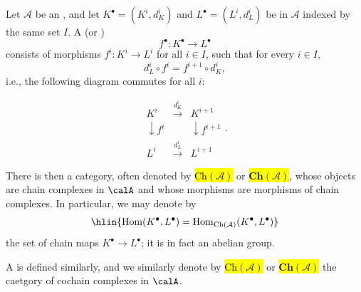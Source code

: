 \begin{definition} \label{definition:chain_complex_of_objects_in_a_preadditive_category}
Let $\mathcal{A}$ be an , and let $K^\bullet = (K^i, d_K^i)$ and $L^\bullet = (L^i, d_L^i)$ be  in $\mathcal{A}$ indexed by the same set $I$. 
A  (or )
$$ f^\bullet: K^\bullet \to L^\bullet $$
consists of morphisms $f^i: K^i \to L^i$ for all $i \in I$, such that for every $i \in I$,
$$ d_L^i \circ f^i = f^{i+1} \circ d_K^i, $$
i.e., the following diagram commutes for all $i$:

$$ \begin{array}{ccc} K^i & \xrightarrow{d_K^i} & K^{i+1} \\ \downarrow{f^i} && \downarrow{f^{i+1}} \\ L^i & \xrightarrow{d_L^i} & L^{i+1} \end{array}.$$

There is then a category, often denoted by \hl{$\mathrm{Ch}(\mathcal{A})$} or \hl{$\mathbf{Ch}(\mathcal{A})$}, whose objects are chain complexes in $\calA$ and whose morphisms are morphisms of chain complexes. In particular, we may denote by 
$$\hlin{\operatorname{Hom}(K^\bullet, L^\bullet)=  \operatorname{Hom}_{\mathrm{Ch}(\mathcal{A})}(K^\bullet, L^\bullet)}$$
the set of chain maps $K^\bullet \to L^\bullet$; it is in fact an abelian group.

A  is defined similarly, and we similarly denote by \hl{$\mathrm{Ch}(\mathcal{A})$} or \hl{$\mathbf{Ch}(\mathcal{A})$} the caetgory of cochain complexes in $\calA$. 
\end{definition}